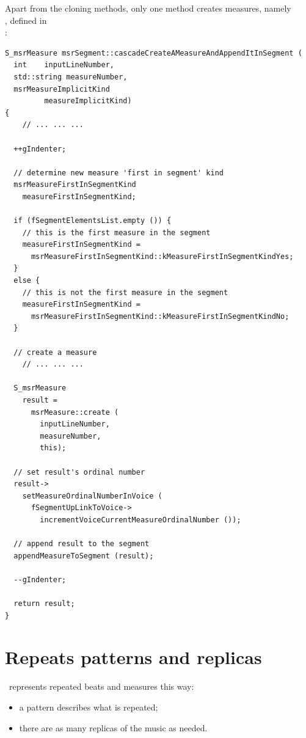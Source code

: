 Apart from the cloning methods, only one method creates measures, namely\\
, defined in\\
:
\begin{lstlisting}[language=CPlusPlus]
S_msrMeasure msrSegment::cascadeCreateAMeasureAndAppendItInSegment (
  int    inputLineNumber,
  std::string measureNumber,
  msrMeasureImplicitKind
         measureImplicitKind)
{
	// ... ... ...

  ++gIndenter;

  // determine new measure 'first in segment' kind
  msrMeasureFirstInSegmentKind
    measureFirstInSegmentKind;

  if (fSegmentElementsList.empty ()) {
    // this is the first measure in the segment
    measureFirstInSegmentKind =
      msrMeasureFirstInSegmentKind::kMeasureFirstInSegmentKindYes;
  }
  else {
    // this is not the first measure in the segment
    measureFirstInSegmentKind =
      msrMeasureFirstInSegmentKind::kMeasureFirstInSegmentKindNo;
  }

  // create a measure
	// ... ... ...

  S_msrMeasure
    result =
      msrMeasure::create (
        inputLineNumber,
        measureNumber,
        this);

  // set result's ordinal number
  result->
    setMeasureOrdinalNumberInVoice (
      fSegmentUpLinkToVoice->
        incrementVoiceCurrentMeasureOrdinalNumber ());

  // append result to the segment
  appendMeasureToSegment (result);

  --gIndenter;

  return result;
}
\end{lstlisting}


\section{Repeats patterns and replicas}\label{Repeats patterns and replicas}

\msrRepr\ represents repeated beats and measures this way:
\begin{itemize}
\item a pattern describes what is repeated;
\item there are as many replicas of the music as needed.
\end{itemize}

